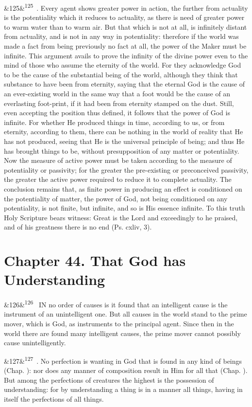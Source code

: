 \documentclass[12pt]{article}
\newcommand{\para}[1][]{\par\noindent\ifx&#1&\else\textsuperscript{\footnotesize #1}~\fi}
\begin{document}
\para[125] 9. Every agent shows greater power in action, the further from actuality is the potentiality which it reduces to actuality, as there is need of greater power to warm water than to warm air. But that which is not at all, is infinitely distant from actuality, and is not in any way in potentiality: therefore if the world was made a fact from being previously no fact at all, the power of the Maker must be infinite. This argument avails to prove the infinity of the divine power even to the mind of those who assume the eternity of the world. For they acknowledge God to be the cause of the substantial being of the world, although they think that substance to have been from eternity, saying that the eternal God is the cause of an ever-existing world in the same way that a foot would be the cause of an everlasting foot-print, if it had been from eternity stamped on the dust. Still, even accepting the position thus defined, it follows that the power of God is infinite. For whether He produced things in time, according to us, or from eternity, according to them, there can be nothing in the world of reality that He has not produced, seeing that He is the universal principle of being; and thus He has brought things to be, without presupposition of any matter or potentiality. Now the measure of active power must be taken according to the measure of potentiality or passivity; for the greater the pre-existing or preconceived passivity, the greater the active power required to reduce it to complete actuality. The conclusion remains that, as finite power in producing an effect is conditioned on the potentiality of matter, the power of God, not being conditioned on any potentiality, is not finite, but infinite, and so is His essence infinite. To this truth Holy Scripture bears witness: Great is the Lord and exceedingly to he praised, and of his greatness there is no end (Ps. cxliv, 3).

\section*{Chapter 44. That God has Understanding}

\para[126] IN no order of causes is it found that an intelligent cause is the instrument of an unintelligent one. But all causes in the world stand to the prime mover, which is God, as instruments to the principal agent. Since then in the world there are found many intelligent causes, the prime mover cannot possibly cause unintelligently.

\para[127] 5. No perfection is wanting in God that is found in any kind of beings (Chap. ): nor does any manner of composition result in Him for all that (Chap. ). But among the perfections of creatures the highest is the possession of understanding: for by understanding a thing is in a manner all things, having in itself the perfections of all things.
\end{document}
